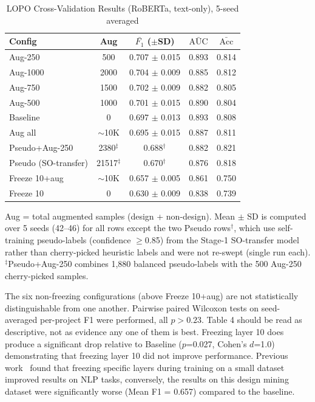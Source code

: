 \documentclass[preprint,12pt]{elsarticle}
\begin{document}
\begin{table}[t]
\centering
\setlength{\tabcolsep}{3pt}
\begin{tabular}{lcccc}
\toprule
\textbf{Config} & \textbf{Aug} & \textbf{$\bar{F_1}$ ($\pm$SD)} & \textbf{$\bar{\text{AUC}}$} & \textbf{$\bar{\text{Acc}}$} \\
\midrule
Aug-250 & 500 & 0.707 $\pm$ 0.015 & 0.893 & 0.814 \\
Aug-1000 & 2000 & 0.704 $\pm$ 0.009 & 0.885 & 0.812 \\
Aug-750 & 1500 & 0.702 $\pm$ 0.009 & 0.882 & 0.805 \\
Aug-500 & 1000 & 0.701 $\pm$ 0.015 & 0.890 & 0.804 \\
Baseline & 0 & 0.697 $\pm$ 0.013 & 0.893 & 0.808 \\
Aug all & $\sim$10K & 0.695 $\pm$ 0.015 & 0.887 & 0.811 \\
Pseudo+Aug-250 & 2380$^\ddagger$ & 0.688$^\dagger$ & 0.882 & 0.821 \\
Pseudo (SO-transfer) & 21517$^\ddagger$ & 0.670$^\dagger$ & 0.876 & 0.818 \\
\midrule
Freeze 10+aug & $\sim$10K & 0.657 $\pm$ 0.005 & 0.861 & 0.750 \\
Freeze 10 & 0 & 0.630 $\pm$ 0.009 & 0.838 & 0.739 \\
\bottomrule
\end{tabular}
\caption{LOPO Cross-Validation Results (RoBERTa, text-only), 5-seed averaged}
\label{tab:lopo}
\begin{flushleft}
\footnotesize Aug = total augmented samples (design + non-design). Mean $\pm$ SD is computed over 5 seeds (42--46) for all rows except the two Pseudo rows$^\dagger$, which use self-training pseudo-labels (confidence $\geq$0.85) from the Stage-1 SO-transfer model rather than cherry-picked heuristic labels and were not re-swept (single run each). $^\ddagger$Pseudo+Aug-250 combines 1,880 balanced pseudo-labels with the 500 Aug-250 cherry-picked samples. 
\end{flushleft}
\end{table}

The six non-freezing configurations (above Freeze 10+aug) are not statistically distinguishable from one another. Pairwise paired Wilcoxon tests on seed-averaged per-project F1 were performed, all $p>0.23$. Table 4 should be read as descriptive, not as evidence any one of them is best. Freezing layer 10 does produce a significant drop relative to Baseline ($p$=0.027, Cohen's $d$=1.0) demonstrating that freezing layer 10 did not improve performance. Previous work~\cite{howard2018ulmfit} found that freezing specific layers during training on a small dataset improved results on NLP tasks, conversely, the results on this design mining dataset were significantly worse (Mean F1 = 0.657) compared to the baseline. 
\end{document}
